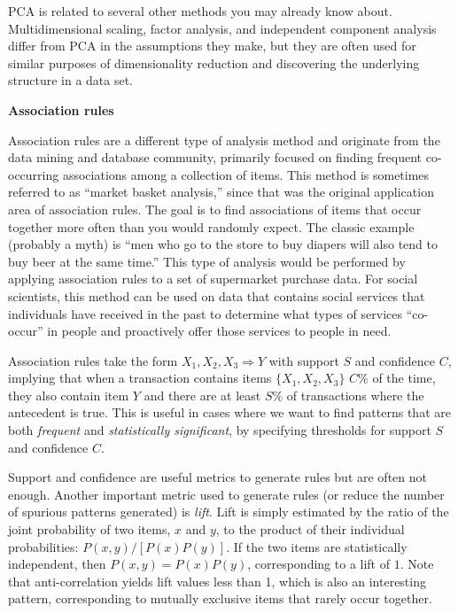\documentclass[]{krantz}
\begin{document}
PCA is related to several other methods you may already know about.
Multidimensional scaling, factor analysis, and independent component
analysis differ from PCA in the assumptions they make, but they are
often used for similar purposes of dimensionality reduction and
discovering the underlying structure in a data set.

\textbf{Association rules}

Association rules are a different type of analysis method and originate
from the data mining and database community, primarily focused on
finding frequent co-occurring associations among a collection of items.
This method is sometimes referred to as ``market basket analysis,''
since that was the original application area of association rules. The
goal is to find associations of items that occur together more often
than you would randomly expect. The classic example (probably a myth) is
``men who go to the store to buy diapers will also tend to buy beer at
the same time.'' This type of analysis would be performed by applying
association rules to a set of supermarket purchase data. For social
scientists, this method can be used on data that contains social
services that individuals have received in the past to determine what
types of services ``co-occur'' in people and proactively offer those
services to people in need.

Association rules take the form \(X_1, X_2, X_3 \Rightarrow Y\) with
support \(S\) and confidence \(C\), implying that when a transaction
contains items \(\{X_1, X_2, X_3\}\) \(C\)\% of the time, they also
contain item \(Y\) and there are at least \(S\)\% of transactions where
the antecedent is true. This is useful in cases where we want to find
patterns that are both \emph{frequent} and \emph{statistically
significant}, by specifying thresholds for support \(S\) and confidence
\(C\).

Support and confidence are useful metrics to generate rules but are
often not enough. Another important metric used to generate rules (or
reduce the number of spurious patterns generated) is \emph{lift}. Lift
is simply estimated by the ratio of the joint probability of two items,
\(x\) and \(y\), to the product of their individual probabilities:
\(P(x,y)/[P(x)P(y)]\). If the two items are statistically independent,
then \(P(x,y)=P(x)P(y)\), corresponding to a lift of \(1\). Note that
anti-correlation yields lift values less than 1, which is also an
interesting pattern, corresponding to mutually exclusive items that
rarely occur together.
\end{document}
